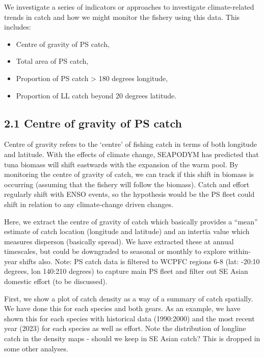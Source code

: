 \documentclass[
]{article}
\begin{document}
We investigate a series of indicators or approaches to investigate
climate-related trends in catch and how we might monitor the fishery
using this data. This includes:

\begin{itemize}
\item
  Centre of gravity of PS catch,
\item
  Total area of PS catch,
\item
  Proportion of PS catch \textgreater{} 180 degrees longitude,
\item
  Proportion of LL catch beyond 20 degrees latitude.
\end{itemize}

\clearpage

\hypertarget{centre-of-gravity-of-ps-catch}{%
\subsection{2.1 Centre of gravity of PS
catch}\label{centre-of-gravity-of-ps-catch}}

Centre of gravity refers to the `centre' of fishing catch in terms of
both longitude and latitude. With the effects of climate change,
SEAPODYM has predicted that tuna biomass will shift eastwards with the
expansion of the warm pool. By monitoring the centre of gravity of
catch, we can track if this shift in biomass is occurring (assuming that
the fishery will follow the biomass). Catch and effort regularly shift
with ENSO events, so the hypothesis would be the PS fleet could shift in
relation to any climate-change driven changes.

Here, we extract the centre of gravity of catch which basically provides
a ``mean'' estimate of catch location (longitude and latitude) and an
intertia value which measures disperson (basically spread). We have
extracted these at annual timescales, but could be downgraded to
seasonal or monthly to explore within-year shifts also. Note: PS catch
data is filtered to WCPFC regions 6-8 (lat: -20:10 degrees, lon 140:210
degrees) to capture main PS fleet and filter out SE Asian domestic
effort (to be discussed).

First, we show a plot of catch density as a way of a summary of catch
spatially. We have done this for each species and both gears. As an
example, we have shown this for each species with historical data
(1990:2000) and the most recent year (2023) for each species as well as
effort. Note the distribution of longline catch in the density maps -
should we keep in SE Asian catch? This is dropped in some other
analyses.
\end{document}
